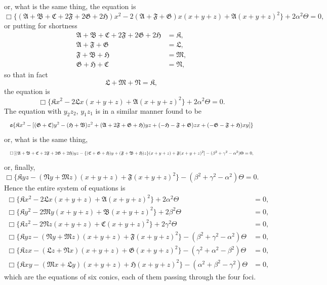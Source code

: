 \documentclass[11pt]{article}
\begin{document}
or, what is the same thing, the equation is
\[ \Box\{(\mathfrak{A}+\mathfrak{B}+\mathfrak{C}+2\mathfrak{F}+2\mathfrak{G}+2\mathfrak{H})x^{2}-2(\mathfrak{A}+\mathfrak{F}+\mathfrak{G})x(x+y+z)+\mathfrak{A}(x+y+z)^{2}\}+2\alpha^{2}\Theta=0, \]
or putting for shortness
\[ \begin{aligned}
\mathfrak{A}+\mathfrak{B}+\mathfrak{C}+2\mathfrak{F}+2\mathfrak{G}+2\mathfrak{H} &= \mathfrak{K},\\
\mathfrak{A}+\mathfrak{F}+\mathfrak{G} &= \mathfrak{L},\\
\mathfrak{F}+\mathfrak{B}+\mathfrak{H} &= \mathfrak{M},\\
\mathfrak{G}+\mathfrak{H}+\mathfrak{C} &= \mathfrak{N},
\end{aligned} \]
so that in fact
\[ \mathfrak{L}+\mathfrak{M}+\mathfrak{N} = \mathfrak{K}, \]
the equation is
\[ \Box\{\mathfrak{K}x^{2}-2\mathfrak{L}x(x+y+z)+\mathfrak{A}(x+y+z)^{2}\}+2\alpha^{2}\Theta=0. \]
The equation with $y_{2}z_{2}$, $y_{1}z_{1}$ is in a similar manner found to be
\[ \resizebox{\textwidth}{!}{$\displaystyle
\mathfrak{a}\{\mathfrak{K}x^{2}-[(\mathfrak{G}+\mathfrak{C})y^{2}-(\mathfrak{H}+\mathfrak{B})z^{2}+(\mathfrak{A}+2\mathfrak{F}+\mathfrak{G}+\mathfrak{H})yz+(-\mathfrak{H}-\mathfrak{F}+\mathfrak{G})zx+(-\mathfrak{G}-\mathfrak{F}+\mathfrak{H})xy]\}
$} \]
or, what is the same thing,
\[ \resizebox{\textwidth}{!}{$\displaystyle
\Box\,[(\mathfrak{A}+\mathfrak{B}+\mathfrak{C}+2\mathfrak{F}+2\mathfrak{G}+2\mathfrak{H})yz-\{(\mathfrak{C}+\mathfrak{G}+\mathfrak{H})y+(\mathfrak{F}+\mathfrak{B}+\mathfrak{H})z\}(x+y+z)+\mathfrak{F}(x+y+z)^{2}]
-(\beta^{2}+\gamma^{2}-\alpha^{2})\Theta=0,
$} \]
or, finally,
\[ \Box\{\mathfrak{K}yz-(\mathfrak{N}y+\mathfrak{M}z)(x+y+z)+\mathfrak{F}(x+y+z)^{2}\}-(\beta^{2}+\gamma^{2}-\alpha^{2})\Theta=0. \]
Hence the entire system of equations is
\[ \begin{aligned}
\Box\{\mathfrak{K}x^{2}-2\mathfrak{L}x(x+y+z)+\mathfrak{A}(x+y+z)^{2}\}+2\alpha^{2}\Theta &= 0,\\
\Box\{\mathfrak{K}y^{2}-2\mathfrak{M}y(x+y+z)+\mathfrak{B}(x+y+z)^{2}\}+2\beta^{2}\Theta &= 0,\\
\Box\{\mathfrak{K}z^{2}-2\mathfrak{N}z(x+y+z)+\mathfrak{C}(x+y+z)^{2}\}+2\gamma^{2}\Theta &= 0,\\
\Box\{\mathfrak{K}yz-(\mathfrak{N}y+\mathfrak{M}z)(x+y+z)+\mathfrak{F}(x+y+z)^{2}\}-(\beta^{2}+\gamma^{2}-\alpha^{2})\Theta &= 0,\\
\Box\{\mathfrak{K}zx-(\mathfrak{L}z+\mathfrak{N}x)(x+y+z)+\mathfrak{G}(x+y+z)^{2}\}-(\gamma^{2}+\alpha^{2}-\beta^{2})\Theta &= 0,\\
\Box\{\mathfrak{K}xy-(\mathfrak{M}x+\mathfrak{L}y)(x+y+z)+\mathfrak{H}(x+y+z)^{2}\}-(\alpha^{2}+\beta^{2}-\gamma^{2})\Theta &= 0,
\end{aligned} \]
which are the equations of six conics, each of them passing through the four foci.
\end{document}

